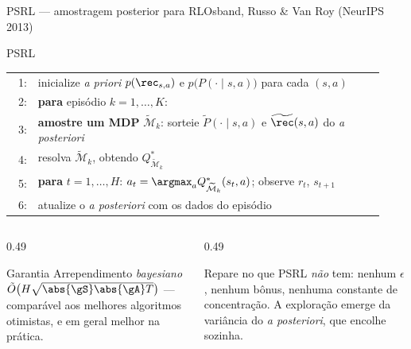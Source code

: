 \documentclass[aspectratio=169, 11pt]{beamer}
\makeatletter
\newcommand{\Mdp}{\mathcal{M}}
\newcommand{\Mtil}{\widetilde{\Mdp}}
\newenvironment{pseudo}[1][0.93\linewidth]{%
  \small\setlength{\tabcolsep}{0pt}%
  \begin{tabular}{@{}r@{\hspace{0.55em}}p{#1}@{}}}%
  {\end{tabular}}
\newcommand{\pln}[1]{{\scriptsize\color{rlCinza}#1:}}
\newcommand{\ind}{\hspace*{1.1em}}
\makeatother
\begin{document}
\begin{frame}{PSRL --- amostragem posterior para RL}{Osband, Russo \& Van Roy (NeurIPS 2013)}
  \vspace{-0.3em}
  \begin{algbox}{PSRL}
    \begin{pseudo}
      \pln{1} & inicialize \textit{a priori} $p(\rec_{s,a})$ e $p\bigl(P(\cdot\mid s,a)\bigr)$
                para cada $(s,a)$ \\
      \pln{2} & \textbf{para} episódio $k = 1,\ldots,K$: \\
      \pln{3} & \ind \textbf{amostre um MDP} $\Mtil_k$: sorteie
                $\widetilde{P}(\cdot\mid s,a)$ e $\widetilde{\rec}(s,a)$ do \textit{a posteriori} \\
      \pln{4} & \ind resolva $\Mtil_k$, obtendo $Q^{*}_{\Mtil_k}$ \\
      \pln{5} & \ind \textbf{para} $t = 1,\ldots,H$:\quad
                $a_t = \argmax_{a} Q^{*}_{\Mtil_k}(s_t, a)$; observe $r_t$, $s_{t+1}$ \\
      \pln{6} & \ind atualize o \textit{a posteriori} com os dados do episódio
    \end{pseudo}
  \end{algbox}
  \vspace{-0.3em}
  \begin{columns}[T]
    \begin{column}{0.49\textwidth}
      \begin{teobox}{Garantia}
        Arrependimento \emph{bayesiano}
        $\tilde{O}\bigl(H\sqrt{\abs{\gS}\abs{\gA}T}\bigr)$ --- comparável aos melhores
        algoritmos otimistas, e em geral melhor na prática.
      \end{teobox}
    \end{column}
    \begin{column}{0.49\textwidth}
      \begin{ideiabox}
        Repare no que PSRL \emph{não} tem: nenhum $\epsilon$, nenhum bônus, nenhuma
        constante de concentração. A exploração emerge da variância do
        \textit{a posteriori}, que encolhe sozinha.
      \end{ideiabox}
    \end{column}
  \end{columns}
\end{frame}
\end{document}
